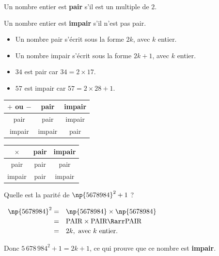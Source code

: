 \begin{defin}[Parité]
	Un nombre entier est \textbf{pair} s'il est un multiple de $2$.

	Un nombre entier est \textbf{impair} s'il n'est pas pair.

	\begin{itemize}
		\item Un nombre pair s'écrit sous la forme $2k$, avec $k$ entier.
		\item Un nombre impair s'écrit sous la forme $2k + 1$, avec $k$ entier.
	\end{itemize}
\end{defin}

\begin{ex}
	\nline
	\begin{itemize}
		\item $34$ est pair car $34 = 2 \times 17$.
		\item $57$ est impair car $57 = 2 \times 28 + 1$.
	\end{itemize}
\end{ex}

\begin{prop}
	\nline
	\begin{center}
		\def\arraystretch{1.4}%
		\begin{tabular}{c|c|c}%
			$+$ ou $-$ & pair   & impair \\
			\hline
			pair       & pair   & impair \\
			impair     & impair & pair   \\
		\end{tabular}
		\qquad\qquad
		\begin{tabular}{c|c|c}%
			$\times$ & pair & impair \\
			\hline
			pair     & pair & pair   \\
			impair   & pair & impair \\
		\end{tabular}
	\end{center}
\end{prop}

\begin{methode}
	Quelle est la parité de $\np{5678984}^2 + 1$ ?

	\begin{correction}
		$\def\arraystretch{1.2}%
			\begin{array}{rl}%
				\np{5678984}^2 = & \np{5678984} \times \np{5678984}                 \\
				=                & \text{PAIR} \times \text{PAIR} \Rarr \text{PAIR} \\
				=                & 2k, \text{ avec } k \text{ entier.}
			\end{array}$%

		\ms

		Donc $5\,678\,984^2 + 1 = 2k + 1$, ce qui prouve que ce nombre est \textbf{impair}.
	\end{correction}
\end{methode}

